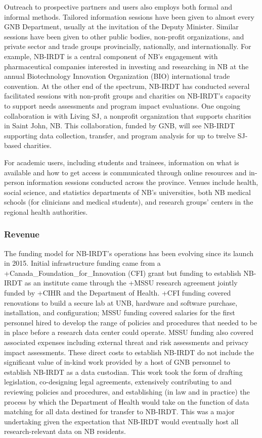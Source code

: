 \documentclass[
]{WileySix}
\begin{document}
Outreach to prospective partners and users also employs both formal and informal methods. Tailored information sessions have been given to almost every GNB Department, usually at the invitation of the Deputy Minister. Similar sessions have been given to other public bodies, non-profit organizations, and private sector and trade groups provincially, nationally, and internationally. For example, NB-IRDT is a central component of NB's engagement with pharmaceutical companies interested in investing and researching in NB at the annual Biotechnology Innovation Organization (BIO) international trade convention. At the other end of the spectrum, NB-IRDT has conducted several facilitated sessions with non-profit groups and charities on NB-IRDT's capacity to support needs assessments and program impact evaluations. One ongoing collaboration is with Living SJ, a nonprofit organization that supports charities in Saint John, NB. This collaboration, funded by GNB, will see NB-IRDT supporting data collection, transfer, and program analysis for up to twelve SJ-based charities.

For academic users, including students and trainees, information on what is available and how to get access is communicated through online resources and in-person information sessions conducted across the province. Venues include health, social science, and statistics departments of NB's universities, both NB medical schools (for clinicians and medical students), and research groups' centers in the regional health authorities.

\hypertarget{revenue-1}{%
\subsubsection{Revenue}\label{revenue-1}}

The funding model for NB-IRDT's operations has been evolving since its launch in 2015. Initial infrastructure funding came from a +Canada\_Foundation\_for\_Innovation\textbar{} (CFI) grant but funding to establish NB-IRDT as an institute came through the +MSSU\textbar{} research agreement jointly funded by +CIHR\textbar{} and the Department of Health. +CFI\textbar{} funding covered renovations to build a secure lab at UNB, hardware and software purchase, installation, and configuration; MSSU funding covered salaries for the first personnel hired to develop the range of policies and procedures that needed to be in place before a research data center could operate. MSSU funding also covered associated expenses including external threat and risk assessments and privacy impact assessments. These direct costs to establish NB-IRDT do not include the significant value of in-kind work provided by a host of GNB personnel to establish NB-IRDT as a data custodian. This work took the form of drafting legislation, co-designing legal agreements, extensively contributing to and reviewing policies and procedures, and establishing (in law and in practice) the process by which the Department of Health would take on the function of data matching for all data destined for transfer to NB-IRDT. This was a major undertaking given the expectation that NB-IRDT would eventually host all research-relevant data on NB residents.
\end{document}
